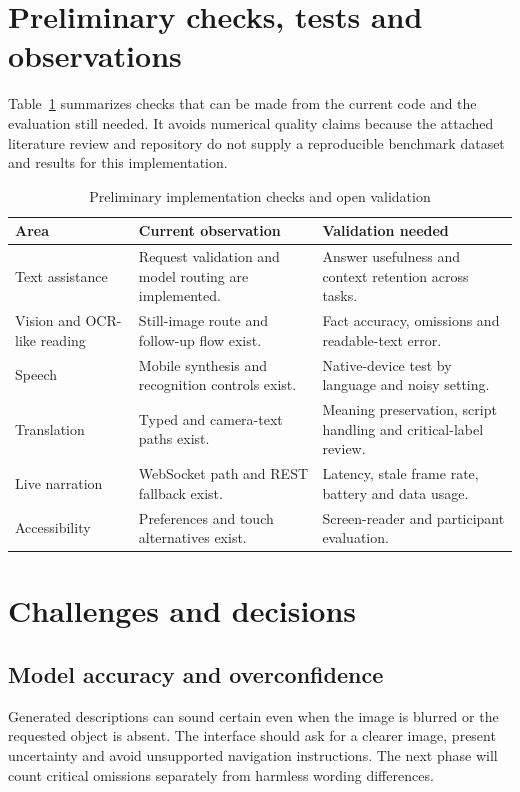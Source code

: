 \documentclass[12pt,a4paper,oneside]{report}
\begin{document}
\section{Preliminary checks, tests and observations}
Table~\ref{tab:checks} summarizes checks that can be made from the current code and the evaluation still needed. It avoids numerical quality claims because the attached literature review and repository do not supply a reproducible benchmark dataset and results for this implementation.
\begin{table}[H]\centering\small\renewcommand{\arraystretch}{1.14}
\caption{Preliminary implementation checks and open validation}\label{tab:checks}
\begin{tabularx}{\textwidth}{|p{}|p{}|X|}\hline
\textbf{Area} & \textbf{Current observation} & \textbf{Validation needed}\\\hline
Text assistance & Request validation and model routing are implemented. & Answer usefulness and context retention across tasks.\\\hline
Vision and OCR-like reading & Still-image route and follow-up flow exist. & Fact accuracy, omissions and readable-text error.\\\hline
Speech & Mobile synthesis and recognition controls exist. & Native-device test by language and noisy setting.\\\hline
Translation & Typed and camera-text paths exist. & Meaning preservation, script handling and critical-label review.\\\hline
Live narration & WebSocket path and REST fallback exist. & Latency, stale frame rate, battery and data usage.\\\hline
Accessibility & Preferences and touch alternatives exist. & Screen-reader and participant evaluation.\\\hline
\end{tabularx}
\end{table}

\section{Challenges and decisions}
\subsection{Model accuracy and overconfidence}
Generated descriptions can sound certain even when the image is blurred or the requested object is absent. The interface should ask for a clearer image, present uncertainty and avoid unsupported navigation instructions. The next phase will count critical omissions separately from harmless wording differences.
\end{document}
